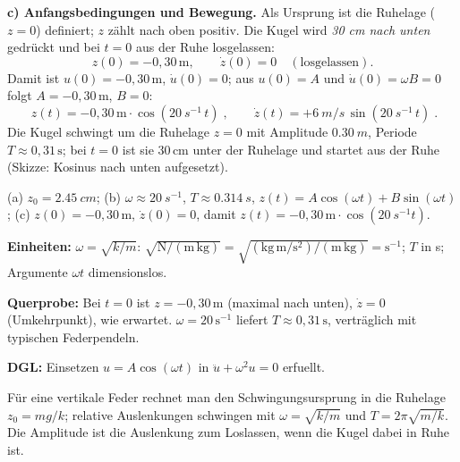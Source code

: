 \textbf{c) Anfangsbedingungen und Bewegung.} Als Ursprung ist die Ruhelage
($z=0$) definiert; $z$ z\"ahlt nach oben positiv. Die Kugel wird \emph{30 cm
nach unten} gedrückt und bei $t=0$ aus der Ruhe losgelassen:
\begin{equation}
  z(0)=-0{,}30\,\mathrm m,\qquad \dot z(0)=0\quad(\text{losgelassen}).
\end{equation}
Damit ist $u(0)=-0{,}30\,\mathrm m$, $\dot u(0)=0$; aus $u(0)=A$ und
$\dot u(0)=\omega B=0$ folgt $A=-0{,}30\,\mathrm m$, $B=0$:
\begin{equation}
  \boxed{\;z(t)=-0{,}30\,\mathrm m\cdot\cos(\qty{20}{s^{-1}}\,t)\;},\qquad
  \dot z(t)=+\qty{6}{m/s}\,\sin(\qty{20}{s^{-1}}\,t)\;.
\end{equation}
Die Kugel schwingt um die Ruhelage $z=0$ mit Amplitude $\qty{0.30}{m}$,
Periode $T\approx0{,}31\,\mathrm s$; bei $t=0$ ist sie 30\,cm unter der
Ruhelage und startet aus der Ruhe (Skizze: Kosinus nach unten aufgesetzt).

\begin{ergebnis}
(a) $z_0=\qty{2.45}{cm}$; (b) $\omega\approx\qty{20}{s^{-1}}$,
$T\approx\qty{0.314}{s}$, $z(t)=A\cos(\omega t)+B\sin(\omega t)$;
(c) $z(0)=-0{,}30\,\mathrm m$, $\dot z(0)=0$, damit
$z(t)=-0{,}30\,\mathrm m\cdot\cos(\qty{20}{s^{-1}}t)$.
\end{ergebnis}

\begin{kontrolle}
\textbf{Einheiten:} $\omega=\sqrt{k/m}$: $\sqrt{\mathrm{N/(m\,kg)}}=
\sqrt{(\mathrm{kg\,m/s^2})/(\mathrm{m\,kg})}=\mathrm{s^{-1}}$; $T$ in s;
Argumente $\omega t$ dimensionslos. \checkmark

\textbf{Querprobe:} Bei $t=0$ ist $z=-0{,}30\,\mathrm m$ (maximal nach
unten), $\dot z=0$ (Umkehrpunkt), wie erwartet. $\omega=20\,\mathrm{s^{-1}}$
liefert $T\approx0{,}31\,\mathrm s$, verträglich mit typischen Federpendeln.
\checkmark

\textbf{DGL:} Einsetzen $u=A\cos(\omega t)$ in $\ddot u+\omega^2u=0$
erfuellt. \checkmark
\end{kontrolle}

\begin{merksatz}
Für eine vertikale Feder rechnet man den Schwingungsursprung in die
Ruhelage $z_0=mg/k$; relative Auslenkungen schwingen mit
$\omega=\sqrt{k/m}$ und $T=2\pi\sqrt{m/k}$. Die Amplitude ist die
Auslenkung zum Loslassen, wenn die Kugel dabei in Ruhe ist.
\end{merksatz}
